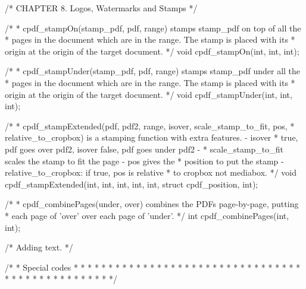 /* CHAPTER 8. Logos, Watermarks and Stamps */

/*
 * cpdf_stampOn(stamp_pdf, pdf, range) stamps stamp_pdf on top of all the
 * pages in the document which are in the range. The stamp is placed with its
 * origin at the origin of the target document.
 */
void cpdf_stampOn(int, int, int);

/*
 * cpdf_stampUnder(stamp_pdf, pdf, range) stamps stamp_pdf under all the
 * pages in the document which are in the range. The stamp is placed with its
 * origin at the origin of the target document.
 */
void cpdf_stampUnder(int, int, int);

/*
 * cpdf_stampExtended(pdf, pdf2, range, isover, scale_stamp_to_fit, pos,
 * relative_to_cropbox) is a stamping function with extra features. - isover
 * true, pdf goes over pdf2, isover false, pdf goes under pdf2 -
 * scale_stamp_to_fit scales the stamp to fit the page - pos gives the
 * position to put the stamp - relative_to_cropbox: if true, pos is relative
 * to cropbox not mediabox.
 */
void cpdf_stampExtended(int, int, int, int, int, struct cpdf_position, int);

/*
 * cpdf_combinePages(under, over) combines the PDFs page-by-page, putting
 * each page of 'over' over each page of 'under'.
 */
int cpdf_combinePages(int, int);

/* Adding text. */

/*
 * Special codes
 *
 * %
 *
 * %
 *
 * %
 *
 * %
 *
 * %
 *
 * %
 *
 * %
 *
 * %
 *
 * %
 *
 * %
 *
 * %
 *
 * %
 *
 * %
 *
 * %
 *
 * %
 *
 * %
 *
 * %
 *
 * %
 *
 * %
 *
 * %
 *
 * %
 *
 * %
 *
 * %
 *
 * %
 */

